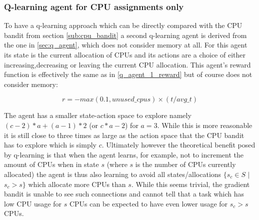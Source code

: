\subsubsection{Q-learning agent for CPU assignments only}

To have a q-learning approach which can be directly compared with the CPU bandit from section \ref{sub:cpu_bandit} a second q-learning agent is derived from the one in \ref{sec:q_agent}, which does not consider memory at all. For this agent its state is the current allocation of CPUs and its actions are a choice of either increasing,decreasing or leaving the current CPU allocation. This agent’s reward function is effectively the same as in \ref{q_agent_1_reward} but of course does not consider memory:

\begin{equation}
\label{q_agent_2_reward}
r = -max(0.1,unused\_cpus) \times (t/avg\_t)
\end{equation}

The agent has a smaller state-action space to explore namely $(c-2)*a + (a-1)*2$ (or $c*a -2$) for $a = 3$. While this is more reasonable it is still close to three times as large as the action space that the CPU bandit has to explore which is simply $c$. Ultimately however the theoretical benefit posed by q-learning is that when the agent learns, for example, not to increment the amount of CPUs when in state $s$ (where $s$ is the number of CPUs currently allocated) the agent is thus also learning to avoid all states/allocations $\{s_c \in S$ $|$ $s_c > s\}$ which allocate more CPUs than $s$. While this seems trivial, the gradient bandit is unable to see such connections and cannot tell that a task which has low CPU usage for $s$ CPUs can be expected to have even lower usage for $s_c > s$ CPUs. 


